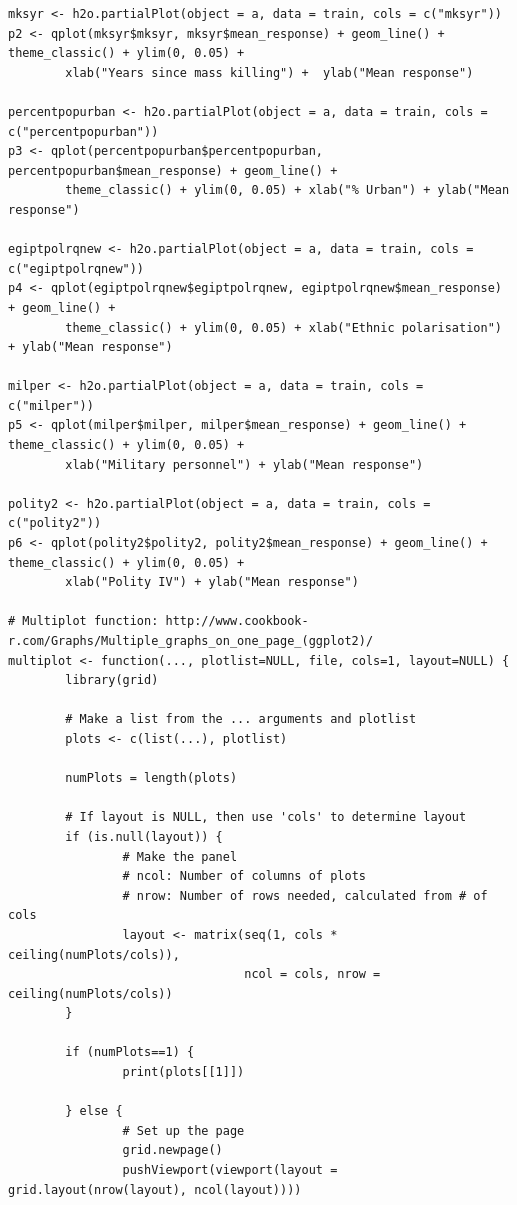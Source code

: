 \documentclass[a4paper,12pt]{article}
\begin{document}
\begin{verbatim}
mksyr <- h2o.partialPlot(object = a, data = train, cols = c("mksyr"))
p2 <- qplot(mksyr$mksyr, mksyr$mean_response) + geom_line() + theme_classic() + ylim(0, 0.05) +
        xlab("Years since mass killing") +  ylab("Mean response")

percentpopurban <- h2o.partialPlot(object = a, data = train, cols = c("percentpopurban"))
p3 <- qplot(percentpopurban$percentpopurban, percentpopurban$mean_response) + geom_line() +
        theme_classic() + ylim(0, 0.05) + xlab("% Urban") + ylab("Mean response")

egiptpolrqnew <- h2o.partialPlot(object = a, data = train, cols = c("egiptpolrqnew"))
p4 <- qplot(egiptpolrqnew$egiptpolrqnew, egiptpolrqnew$mean_response) + geom_line() +
        theme_classic() + ylim(0, 0.05) + xlab("Ethnic polarisation") + ylab("Mean response")

milper <- h2o.partialPlot(object = a, data = train, cols = c("milper"))
p5 <- qplot(milper$milper, milper$mean_response) + geom_line() + theme_classic() + ylim(0, 0.05) +
        xlab("Military personnel") + ylab("Mean response")

polity2 <- h2o.partialPlot(object = a, data = train, cols = c("polity2"))
p6 <- qplot(polity2$polity2, polity2$mean_response) + geom_line() + theme_classic() + ylim(0, 0.05) +
        xlab("Polity IV") + ylab("Mean response")
        
# Multiplot function: http://www.cookbook-r.com/Graphs/Multiple_graphs_on_one_page_(ggplot2)/
multiplot <- function(..., plotlist=NULL, file, cols=1, layout=NULL) {
        library(grid)
        
        # Make a list from the ... arguments and plotlist
        plots <- c(list(...), plotlist)
        
        numPlots = length(plots)
        
        # If layout is NULL, then use 'cols' to determine layout
        if (is.null(layout)) {
                # Make the panel
                # ncol: Number of columns of plots
                # nrow: Number of rows needed, calculated from # of cols
                layout <- matrix(seq(1, cols * ceiling(numPlots/cols)),
                                 ncol = cols, nrow = ceiling(numPlots/cols))
        }
        
        if (numPlots==1) {
                print(plots[[1]])
                
        } else {
                # Set up the page
                grid.newpage()
                pushViewport(viewport(layout = grid.layout(nrow(layout), ncol(layout))))
                

\end{verbatim}
\end{document}

